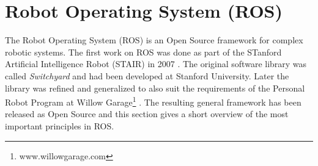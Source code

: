 

\section{Robot Operating System (ROS)}
\label{ros_overview}
The Robot Operating System (ROS) is an Open Source framework for complex robotic systems. The first work on ROS was done as part of the STanford Artificial Intelligence Robot (STAIR) in 2007 \cite{Quigley2007}. The original software library was called \emph{Switchyard} and had been developed at Stanford University. Later the library was refined and generalized to also suit the requirements of the Personal Robot Program at Willow Garage\footnote{www.willowgarage.com} \cite{Quigley2009}. The resulting general framework has been released as Open Source \cite{Quigley2009} and this section gives a short overview of the most important principles in ROS.

